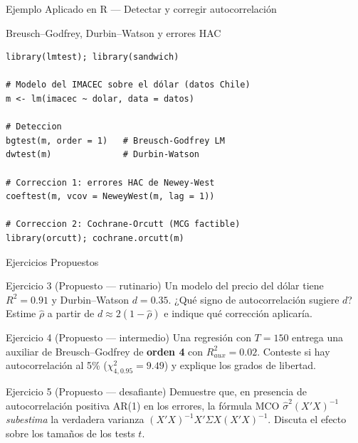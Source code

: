 \documentclass{beamer}
\begin{document}
\begin{frame}[fragile]{Ejemplo Aplicado en R --- Detectar y corregir autocorrelación}

\begin{exampleblock}{Breusch--Godfrey, Durbin--Watson y errores HAC}
\begin{verbatim}
library(lmtest); library(sandwich)

# Modelo del IMACEC sobre el dólar (datos Chile)
m <- lm(imacec ~ dolar, data = datos)

# Deteccion
bgtest(m, order = 1)   # Breusch-Godfrey LM
dwtest(m)              # Durbin-Watson

# Correccion 1: errores HAC de Newey-West
coeftest(m, vcov = NeweyWest(m, lag = 1))

# Correccion 2: Cochrane-Orcutt (MCG factible)
library(orcutt); cochrane.orcutt(m)
\end{verbatim}
\end{exampleblock}

\end{frame}

\begin{frame}{Ejercicios Propuestos}

\begin{block}{Ejercicio 3 (Propuesto --- rutinario)}
Un modelo del precio del dólar tiene $R^2=0.91$ y Durbin--Watson $d=0.35$. ¿Qué signo de autocorrelación sugiere $d$? Estime $\hat\rho$ a partir de $d\approx2(1-\hat\rho)$ e indique qué corrección aplicaría.
\end{block}

\begin{block}{Ejercicio 4 (Propuesto --- intermedio)}
Una regresión con $T=150$ entrega una auxiliar de Breusch--Godfrey de \textbf{orden 4} con $R^2_{aux}=0.02$. Conteste si hay autocorrelación al 5\% ($\chi^2_{4,0.95}=9.49$) y explique los grados de libertad.
\end{block}

\begin{block}{Ejercicio 5 (Propuesto --- desafiante)}
Demuestre que, en presencia de autocorrelación positiva AR(1) en los errores, la fórmula MCO $\hat\sigma^2(X'X)^{-1}$ \emph{subestima} la verdadera varianza $(X'X)^{-1}X'\Sigma X(X'X)^{-1}$. Discuta el efecto sobre los tamaños de los tests $t$.
\end{block}

\end{frame}
\end{document}
